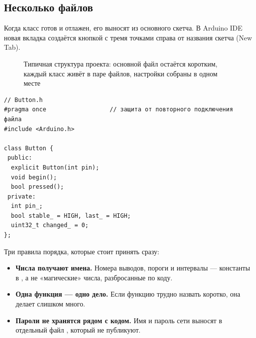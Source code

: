 \subsection{Несколько файлов}

Когда класс готов и отлажен, его выносят из основного скетча. В Arduino IDE новая вкладка создаётся
кнопкой с тремя точками справа от названия скетча (\textsf{New Tab}).

\begin{figure}[H]
\centering
{}
\caption{Типичная структура проекта: основной файл остаётся коротким, каждый класс живёт в паре файлов,
настройки собраны в одном месте}
\end{figure}

\begin{Verbatim}[fontsize=\small,bgcolor=codebg]
// Button.h
#pragma once                  // защита от повторного подключения файла
#include <Arduino.h>

class Button {
 public:
  explicit Button(int pin);
  void begin();
  bool pressed();
 private:
  int pin_;
  bool stable_ = HIGH, last_ = HIGH;
  uint32_t changed_ = 0;
};
\end{Verbatim}

Три правила порядка, которые стоит принять сразу:
\begin{itemize}
  \item \textbf{Числа получают имена.} Номера выводов, пороги и интервалы --- константы в ,
        а не «магические» числа, разбросанные по коду.
  \item \textbf{Одна функция --- одно дело.} Если функцию трудно назвать коротко, она делает слишком много.
  \item \textbf{Пароли не хранятся рядом с кодом.} Имя и пароль сети выносят в отдельный файл
        , который не публикуют.
\end{itemize}

